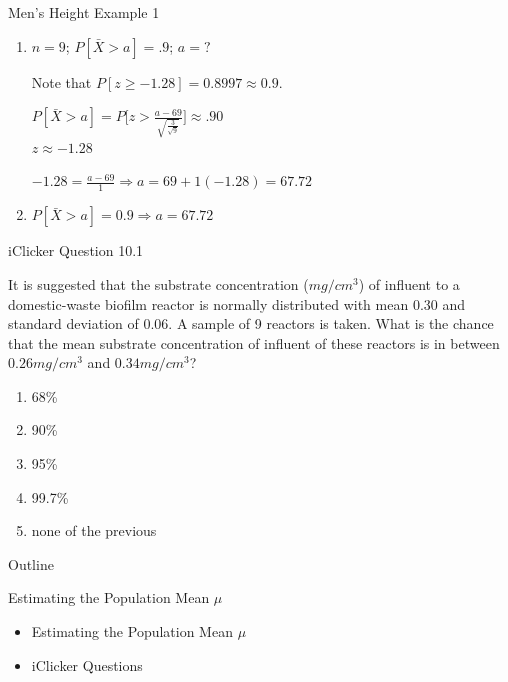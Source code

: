\documentclass[14pt]{beamer}\usepackage[]{graphicx}\usepackage[]{color}
\begin{document}
\begin{frame}[fragile]{Men's Height Example 1}

\begin{enumerate}[a]
\item<1-> $n = 9$; $P[\bar{X} > a] =.9$; $a = ?$

Note that $P[ z \ge -1.28] = 0.8997 \approx 0.9$.


$P[ \bar{X} > a] = P\Big[ z > \frac{a - 69}{ \sqrt{ \frac{3}{\sqrt{9}}}} \Big] \approx .90$ \\
$z \approx -1.28$


{\footnotesize{
$ -1.28 = \frac{a - 69}{1} \Rightarrow a = 69 + 1(-1.28) = 67.72$
}}

\item<2-> $P[\bar{X} > a] = 0.9 \Rightarrow a = 67.72 $
\end{enumerate}
\end{frame}

\begin{frame}[fragile]{iClicker Question 10.1}

It is suggested that the substrate concentration ($mg/cm^3$) of influent to  a domestic-waste biofilm reactor is normally distributed with mean 0.30  and standard deviation of 0.06. A sample of 9 reactors is taken. What  is the chance that the mean substrate concentration of influent of  these reactors is in between $0.26 mg/cm^3$  and $0.34 mg/cm^3$?

\begin{enumerate}
\item 68\%
\item 90\%
\item 95\%
\item 99.7\%
\item none of the previous
\end{enumerate}
\end{frame}

\begin{frame}[fragile]{Outline}

Estimating the Population Mean $\mu$    
\begin{itemize}
\item Estimating the Population Mean $\mu$
\item iClicker Questions
\end{itemize}
\end{frame}
\end{document}
